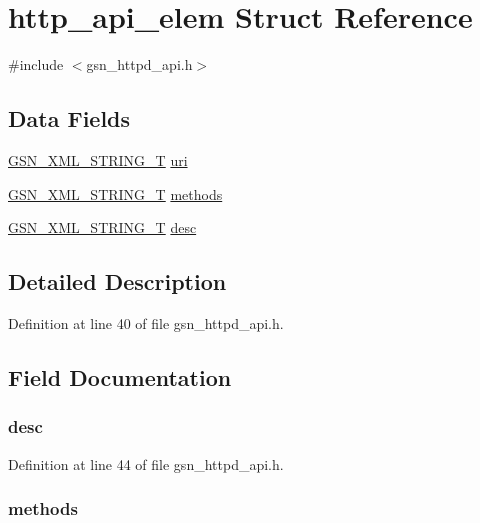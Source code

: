 \hypertarget{a00446}{
\section{http\_\-api\_\-elem Struct Reference}
\label{a00446}
}


{\ttfamily \#include $<$gsn\_\-httpd\_\-api.h$>$}

\subsection*{Data Fields}
\begin{DoxyCompactItemize}
\item 
\hyperlink{a00436}{GSN\_\-XML\_\-STRING\_\-T} \hyperlink{a00446_a0153cffe7ce2a9b72ddc1a48fd8e4add}{uri}
\item 
\hyperlink{a00436}{GSN\_\-XML\_\-STRING\_\-T} \hyperlink{a00446_a6c9669da3706f136e1e9dc7f8a683fc3}{methods}
\item 
\hyperlink{a00436}{GSN\_\-XML\_\-STRING\_\-T} \hyperlink{a00446_a1acd00e3db52847bb3fa2f40d7e82a5f}{desc}
\end{DoxyCompactItemize}


\subsection{Detailed Description}


Definition at line 40 of file gsn\_\-httpd\_\-api.h.



\subsection{Field Documentation}
\hypertarget{a00446_a1acd00e3db52847bb3fa2f40d7e82a5f}{
\subsubsection[{desc}]{ {\bf desc}}}
\label{a00446_a1acd00e3db52847bb3fa2f40d7e82a5f}


Definition at line 44 of file gsn\_\-httpd\_\-api.h.

\hypertarget{a00446_a6c9669da3706f136e1e9dc7f8a683fc3}{
\subsubsection[{methods}]{ {\bf methods}}}
\label{a00446_a6c9669da3706f136e1e9dc7f8a683fc3}


